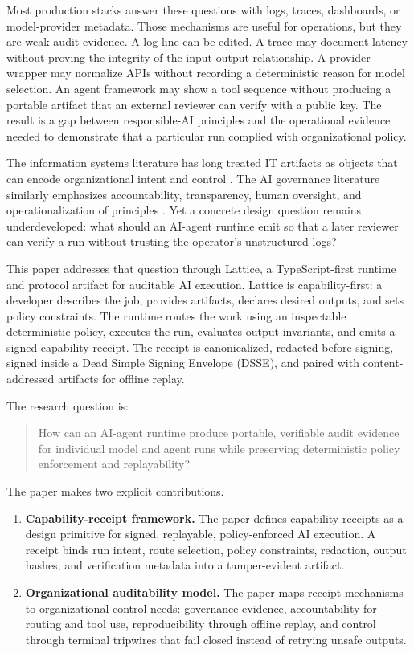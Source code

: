 \documentclass[conference]{IEEEtran}
\begin{document}
Most production stacks answer these questions with logs, traces, dashboards, or
model-provider metadata. Those mechanisms are useful for operations, but they
are weak audit evidence. A log line can be edited. A trace may document latency
without proving the integrity of the input-output relationship. A provider
wrapper may normalize APIs without recording a deterministic reason for model
selection. An agent framework may show a tool sequence without producing a
portable artifact that an external reviewer can verify with a public key. The
result is a gap between responsible-AI principles and the operational evidence
needed to demonstrate that a particular run complied with organizational policy.

The information systems literature has long treated IT artifacts as objects that
can encode organizational intent and control \cite{hevner2004dsr,gregor2013dsr}.
The AI governance literature similarly emphasizes accountability,
transparency, human oversight, and operationalization of principles
\cite{jobin2019global,berente2021managingai,raji2020accountability}. Yet a
concrete design question remains underdeveloped: what should an AI-agent
runtime emit so that a later reviewer can verify a run without trusting the
operator's unstructured logs?

This paper addresses that question through Lattice, a TypeScript-first runtime
and protocol artifact for auditable AI execution. Lattice is capability-first:
a developer describes the job, provides artifacts, declares desired outputs, and
sets policy constraints. The runtime routes the work using an inspectable
deterministic policy, executes the run, evaluates output invariants, and emits a
signed capability receipt. The receipt is canonicalized, redacted before
signing, signed inside a Dead Simple Signing Envelope (DSSE), and paired with
content-addressed artifacts for offline replay.

The research question is:

\begin{quote}
How can an AI-agent runtime produce portable, verifiable audit evidence for
individual model and agent runs while preserving deterministic policy
enforcement and replayability?
\end{quote}

The paper makes two explicit contributions.

\begin{enumerate}
\item \textbf{Capability-receipt framework.} The paper defines capability
receipts as a design primitive for signed, replayable, policy-enforced AI
execution. A receipt binds run intent, route selection, policy constraints,
redaction, output hashes, and verification metadata into a tamper-evident
artifact.
\item \textbf{Organizational auditability model.} The paper maps receipt
mechanisms to organizational control needs: governance evidence, accountability
for routing and tool use, reproducibility through offline replay, and control
through terminal tripwires that fail closed instead of retrying unsafe outputs.
\end{enumerate}
\end{document}

